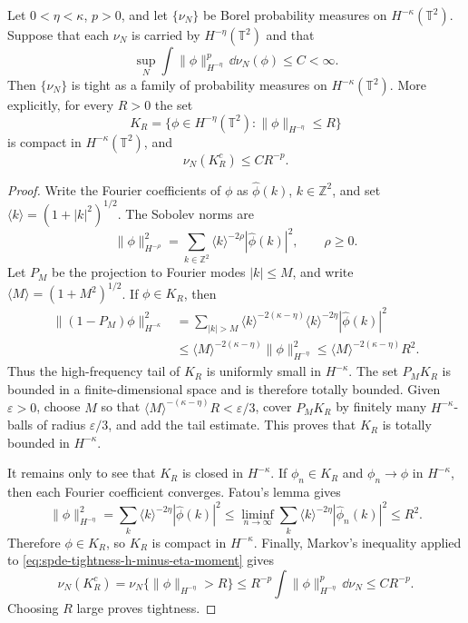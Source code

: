 \begin{lemma}
\label{lem:spde-sobolev-compactness-tightness}
Let \(0<\eta<\kappa\), \(p>0\), and let \(\{\nu_N\}\) be Borel probability
measures on \(H^{-\kappa}(\mathbb T^2)\).  Suppose that each \(\nu_N\) is
carried by \(H^{-\eta}(\mathbb T^2)\) and that
\begin{equation}
  \sup_N
  \int
  \|\phi\|_{H^{-\eta}}^p\,\dd\nu_N(\phi)
  \leq C
  <\infty .
  \label{eq:spde-tightness-h-minus-eta-moment}
\end{equation}
Then \(\{\nu_N\}\) is tight as a family of probability measures on
\(H^{-\kappa}(\mathbb T^2)\).  More explicitly, for every \(R>0\) the set
\[
  K_R=\{\phi\in H^{-\eta}(\mathbb T^2):
          \|\phi\|_{H^{-\eta}}\leq R\}
\]
is compact in \(H^{-\kappa}(\mathbb T^2)\), and
\[
  \nu_N(K_R^c)\leq C R^{-p}.
\]
\end{lemma}

\begin{proof}
Write the Fourier coefficients of \(\phi\) as \(\widehat\phi(k)\),
\(k\in\mathbb Z^2\), and set
\(\langle k\rangle=(1+|k|^2)^{1/2}\).  The Sobolev norms are
\begin{equation}
  \|\phi\|_{H^{-\rho}}^2
  =
  \sum_{k\in\mathbb Z^2}
  \langle k\rangle^{-2\rho}|\widehat\phi(k)|^2 ,
  \qquad \rho\geq0 .
  \label{eq:spde-negative-sobolev-fourier-norm}
\end{equation}
Let \(P_M\) be the projection to Fourier modes \(|k|\leq M\), and write
\(\langle M\rangle=(1+M^2)^{1/2}\).  If \(\phi\in K_R\), then
\[
\begin{aligned}
  \|(1-P_M)\phi\|_{H^{-\kappa}}^2
  &=
  \sum_{|k|>M}
  \langle k\rangle^{-2(\kappa-\eta)}
  \langle k\rangle^{-2\eta}|\widehat\phi(k)|^2
\\
  &\leq
  \langle M\rangle^{-2(\kappa-\eta)}
  \|\phi\|_{H^{-\eta}}^2
  \leq
  \langle M\rangle^{-2(\kappa-\eta)}R^2 .
\end{aligned}
\]
Thus the high-frequency tail of \(K_R\) is uniformly small in
\(H^{-\kappa}\).  The set \(P_MK_R\) is bounded in a finite-dimensional
space and is therefore totally bounded.  Given \(\varepsilon>0\), choose
\(M\) so that
\(\langle M\rangle^{-(\kappa-\eta)}R<\varepsilon/3\), cover \(P_MK_R\) by
finitely many \(H^{-\kappa}\)-balls of radius \(\varepsilon/3\), and add the
tail estimate.  This proves that \(K_R\) is totally bounded in
\(H^{-\kappa}\).

It remains only to see that \(K_R\) is closed in \(H^{-\kappa}\).  If
\(\phi_n\in K_R\) and \(\phi_n\to\phi\) in \(H^{-\kappa}\), then each
Fourier coefficient converges.  Fatou's lemma gives
\[
  \|\phi\|_{H^{-\eta}}^2
  =
  \sum_k
  \langle k\rangle^{-2\eta}|\widehat\phi(k)|^2
  \leq
  \liminf_{n\to\infty}
  \sum_k
  \langle k\rangle^{-2\eta}|\widehat\phi_n(k)|^2
  \leq R^2 .
\]
Therefore \(\phi\in K_R\), so \(K_R\) is compact in \(H^{-\kappa}\).
Finally, Markov's inequality applied to
\eqref{eq:spde-tightness-h-minus-eta-moment} gives
\[
  \nu_N(K_R^c)
  =
  \nu_N\{\|\phi\|_{H^{-\eta}}>R\}
  \leq
  R^{-p}\int\|\phi\|_{H^{-\eta}}^p\,\dd\nu_N
  \leq C R^{-p}.
\]
Choosing \(R\) large proves tightness.
\end{proof}

